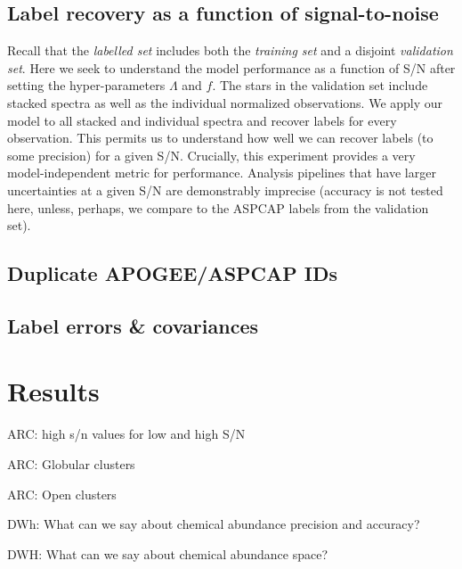 \documentclass[12pt,preprint]{aastex}
\begin{document}



\subsection{Label recovery as a function of signal-to-noise}
\label{sec:label-recovery-snr}

Recall that the \emph{labelled set} includes both the \emph{training set} and
a disjoint \emph{validation set}.  Here we seek to understand the model performance
as a function of S/N after setting the hyper-parameters $\Lambda$ and $f$.
The stars in the validation set include stacked
spectra as well as the individual normalized observations.  We apply our model to
all stacked and individual spectra and recover labels for every observation. 
This permits us to understand how well we can recover labels (to some precision)
for a given S/N.  Crucially, this experiment provides a very model-independent
metric for performance.  Analysis pipelines that have larger uncertainties
at a given S/N are demonstrably imprecise (accuracy is not tested here, unless,
perhaps, we compare to the ASPCAP labels from the validation set).



\subsection{Duplicate APOGEE/ASPCAP IDs}
\label{sec:duplicate-ids}

\subsection{Label errors \& covariances}
\label{sec:errors}



\section{Results}
\label{sec:results}

ARC: high s/n values for low and high S/N

ARC: Globular clusters

ARC: Open clusters




DWh: What can we say about chemical abundance precision and accuracy?

DWH: What can we say about chemical abundance space?
\end{document}
